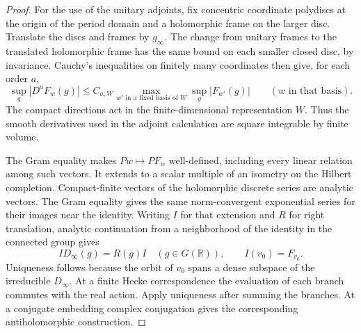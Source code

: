 \begin{proof}
For the use of the unitary adjoints, fix concentric coordinate
polydiscs at the origin of the period domain and a holomorphic
frame on the larger disc. Translate the discs and frames by
\(g_\infty\). The change from unitary frames to the translated
holomorphic frame has the same bound on each smaller closed disc,
by invariance. Cauchy's inequalities on finitely many coordinates
then give, for each order \(a\),
\[
    \sup_g |D^a F_w(g)|\le C_{a,W}\!
           \max_{w'\text{ in a fixed basis of }W}\sup_g|F_{w'}(g)|
               \qquad(w\text{ in that basis}).
\]
The compact directions act in the finite-dimensional representation
\(W\). Thus the smooth derivatives used in the adjoint calculation
are square integrable by finite volume.

The Gram equality makes \(P w\mapsto P F_w\) well-defined,
including every linear relation among such vectors. It extends
to a scalar multiple of an isometry on the Hilbert completion.
Compact-finite vectors of the holomorphic discrete series are analytic vectors. The Gram equality gives the same norm-convergent exponential series for their images near the identity. Writing \(I\) for that extension and \(R\) for right translation, analytic continuation from a neighborhood of the identity in the connected group gives
\[
       I D_\infty(g)=R(g)I\quad(g\in G(\mathbb R)),\qquad I(v_0)=F_{v_0}.
\]
Uniqueness follows because the orbit of \(v_0\) spans a dense
subspace of the irreducible \(D_\infty\). At a finite Hecke
correspondence the evaluation of each branch commutes with
the real action. Apply uniqueness after summing the branches.
At a conjugate embedding complex conjugation gives the
corresponding antiholomorphic construction.
\end{proof}

